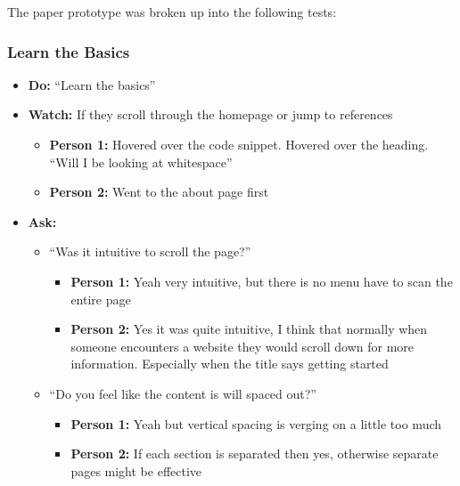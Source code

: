 The paper prototype was broken up into the following tests:

\subsubsection{Learn the Basics}
\begin{itemize}
	\item\textbf{Do:} ``Learn the basics''
	\item\textbf{Watch:} If they scroll through the homepage or jump to references
	\begin{itemize}
		\item\textbf{Person 1:} Hovered over the code snippet. Hovered over the heading. ``Will I be looking at whitespace''
		\item\textbf{Person 2:} Went to the about page first
	\end{itemize}
	\item\textbf{Ask:}
	\begin{itemize}
		\item ``Was it intuitive to scroll	the page?''
		\begin{itemize}
			\item\textbf{Person 1:} Yeah very intuitive, but there is no menu have to scan the entire page
			\item\textbf{Person 2:} Yes it was quite intuitive, I think that normally when someone encounters a website they would scroll down for more information. Especially when the title says getting started
		\end{itemize}
		\item ``Do you feel like the content is will spaced out?''
		\begin{itemize}
			\item\textbf{Person 1:} Yeah but vertical spacing is verging on a little too much
			\item\textbf{Person 2:} If each section is separated then yes, otherwise separate pages might be effective
		\end{itemize}
	\end{itemize}
\end{itemize}


